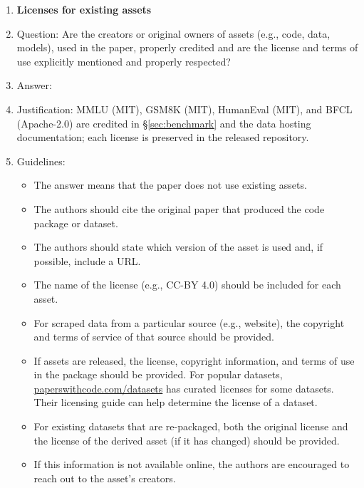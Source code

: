 \documentclass[11pt]{article}
\begin{document}
\begin{enumerate}
\item {\bf Licenses for existing assets}
    \item[] Question: Are the creators or original owners of assets (e.g., code, data, models), used in the paper, properly credited and are the license and terms of use explicitly mentioned and properly respected?
    \item[] Answer: \answerYes{}
    \item[] Justification: MMLU (MIT), GSM8K (MIT), HumanEval (MIT), and BFCL (Apache-2.0) are credited in \S\ref{sec:benchmark} and the data hosting documentation; each license is preserved in the released repository.
    \item[] Guidelines:
    \begin{itemize}
        \item The answer \answerNA{} means that the paper does not use existing assets.
        \item The authors should cite the original paper that produced the code package or dataset.
        \item The authors should state which version of the asset is used and, if possible, include a URL.
        \item The name of the license (e.g., CC-BY 4.0) should be included for each asset.
        \item For scraped data from a particular source (e.g., website), the copyright and terms of service of that source should be provided.
        \item If assets are released, the license, copyright information, and terms of use in the package should be provided. For popular datasets, \url{paperswithcode.com/datasets} has curated licenses for some datasets. Their licensing guide can help determine the license of a dataset.
        \item For existing datasets that are re-packaged, both the original license and the license of the derived asset (if it has changed) should be provided.
        \item If this information is not available online, the authors are encouraged to reach out to the asset's creators.
    \end{itemize}


\end{enumerate}
\end{document}
